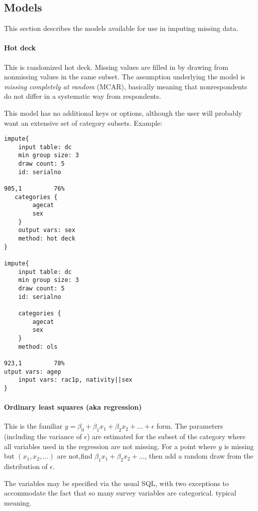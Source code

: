 \documentclass{article}
\begin{document}
\subsection{Models} This section describes the models available for use in imputing
missing data.

\paragraph{Hot deck} This is randomized hot deck. Missing values are filled in by
drawing from nonmissing values in the same subset. The assumption underlying the model
is {\em missing completely at random} (MCAR), basically meaning that nonrespondents
do not differ in a systematic way from respondents.

This model has no additional keys or options, although the user will probably want an
extensive set of category subsets. Example:

\begin{lstlisting}
impute{
    input table: dc
    min group size: 3
    draw count: 5
    id: serialno
                                                                             905,1         76%
   categories {
        agecat
        sex
    }
    output vars: sex
    method: hot deck
}

impute{
    input table: dc
    min group size: 3
    draw count: 5
    id: serialno

    categories {
        agecat
        sex
    }
    method: ols
                                                                             923,1         78%
utput vars: agep
    input vars: rac1p, nativity||sex
}
\end{lstlisting}

\paragraph{Ordinary least squares (aka regression)}  This is the familiar $y = \beta_0
+ \beta_1 x_1  + \beta_2 x_2 + \dots +\epsilon$ form. The parameters (including the
variance of $\epsilon$) are estimated for the subset of the category where all variables
used in the regression are not missing. For a point where $y$ is missing but $(x_1, x_2, \dots)$ are not,find $\beta_1 x_1  + \beta_2 x_2 + \dots$, then add a random draw from the distribution of $\epsilon$.

The variables may be specified via the usual SQL, with two exceptions to accommodate the
fact that so many survey variables are categorical.
typical meaning.
\end{document}
